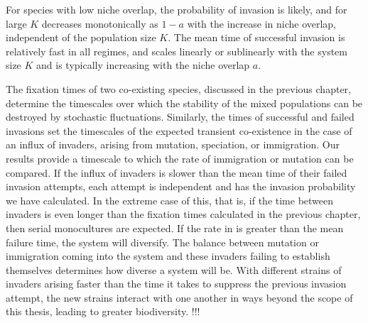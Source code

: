 For species with low niche overlap, the probability of invasion is likely, and for large $K$ decreases monotonically as $1-a$ with the increase in niche overlap, independent of the population size $K$. 
The mean time of successful invasion is relatively fast in all regimes, and scales linearly or sublinearly with the system size $K$ and is typically increasing with the niche overlap $a$.

The fixation times of two co-existing species, discussed in the previous chapter, determine the timescales over which the stability of the mixed populations can be destroyed by stochastic fluctuations. 
Similarly, the times of successful and failed invasions set the timescales of the expected transient co-existence in the case of an influx of invaders, arising from mutation, speciation, or immigration. 
Our results provide a timescale to which the rate of immigration or mutation can be compared. 
If the influx of invaders is slower than the mean time of their failed invasion attempts, each attempt is independent and has the invasion probability we have calculated. 
In the extreme case of this, that is, if the time between invaders is even longer than the fixation times calculated in the previous chapter, then serial monocultures are expected.
If the rate in is greater than the mean failure time, the system will diversify. 
The balance between mutation or immigration coming into the system and these invaders failing to establish themselves determines how diverse a system will be. %
With different strains of invaders arising faster than the time it takes to suppress the previous invasion attempt, the new strains interact with one another in ways beyond the scope of this thesis, leading to greater biodiversity. 
!!!%

